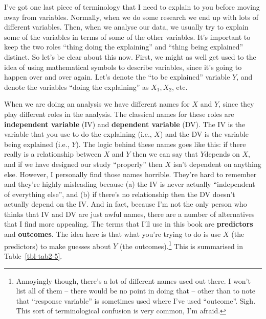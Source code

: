 \documentclass[
  a4paper,
]{book}
\begin{document}
I've got one last piece of terminology that I need to explain to you
before moving away from variables. Normally, when we do some research we
end up with lots of different variables. Then, when we analyse our data,
we usually try to explain some of the variables in terms of some of the
other variables. It's important to keep the two roles ``thing doing the
explaining'' and ``thing being explained'' distinct. So let's be clear
about this now. First, we might as well get used to the idea of using
mathematical symbols to describe variables, since it's going to happen
over and over again. Let's denote the ``to be explained'' variable
\(Y\), and denote the variables ``doing the explaining'' as
\(X_1 , X_2\), etc.

When we are doing an analysis we have different names for \(X\) and
\(Y\), since they play different roles in the analysis. The classical
names for these roles are \textbf{independent variable} (IV) and
\textbf{dependent variable} (DV). The IV is the variable that you use to
do the explaining (i.e., \(X\)) and the DV is the variable being
explained (i.e., \(Y\)). The logic behind these names goes like this: if
there really is a relationship between \(X\) and \(Y\) then we can say
that \(Y\)depends on \(X\), and if we have designed our study
``properly'' then \(X\) isn't dependent on anything else. However, I
personally find those names horrible. They're hard to remember and
they're highly misleading because (a) the IV is never actually
``independent of everything else'', and (b) if there's no relationship
then the DV doesn't actually depend on the IV. And in fact, because I'm
not the only person who thinks that IV and DV are just awful names,
there are a number of alternatives that I find more appealing. The terms
that I'll use in this book are \textbf{predictors} and
\textbf{outcomes}. The idea here is that what you're trying to do is use
\(X\) (the predictors) to make guesses about \(Y\) (the
outcomes).\footnote{Annoyingly though, there's a lot of different names
  used out there. I won't list all of them -- there would be no point in
  doing that -- other than to note that ``response variable'' is
  sometimes used where I've used ``outcome''. Sigh. This sort of
  terminological confusion is very common, I'm afraid.} This is
summarised in Table~\ref{tbl-tab2-5}.

\hypertarget{tbl-tab2-5}{}
 
  \providecommand{\huxb}[2]{\arrayrulecolor[RGB]{#1}\global\arrayrulewidth=#2pt}
  \providecommand{\huxvb}[2]{\color[RGB]{#1}\vrule width #2pt}
  \providecommand{\huxtpad}[1]{\rule{0pt}{#1}}
  \providecommand{\huxbpad}[1]{\rule[-#1]{0pt}{#1}}
\end{document}
